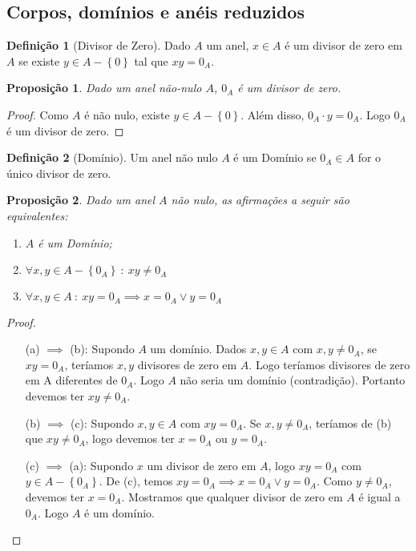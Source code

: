 \documentclass{article}
\theoremstyle{plain}
\newtheorem{prop}{Proposição}[section]
\theoremstyle{definition}
\newtheorem{definicao}{Definição}[section]
\theoremstyle{remark}
\begin{document}
\subsection{Corpos, domínios e anéis reduzidos}
\begin{definicao}[Divisor de Zero]
	Dado $A$ um anel, $x\in A$ é um divisor de zero em $A$ se existe $y\in A-\left\{0 \right\}$ tal que $xy = 0_A$.
\end{definicao}
\begin{prop}
	Dado um anel não-nulo $A$, $0_A$ é um divisor de zero.
\end{prop}
\begin{proof}
	Como $A$ é não nulo, existe $y\in A - \left\{0\right\}$. Além disso, $0_A \cdot y = 0_A$. Logo $0_A$ é um divisor de zero.
\end{proof}
\begin{definicao}[Domínio]
	Um anel não nulo $A$ é um Domínio se $0_A \in A$ for o único divisor de zero.
\end{definicao}
\begin{prop}
	Dado um anel $A$ não nulo, as afirmações a seguir são equivalentes:
	\begin{enumerate}[label=(\alph*)]
		\item $A$ é um Domínio;
		\item $\forall x,y \in A - \left\{ 0_A\right\} \: : \: xy \neq 0_A$
		\item $\forall x,y \in A  \: : \: xy = 0_A \implies x = 0_A \lor y = 0_A$
	\end{enumerate}
\end{prop}
\begin{proof}
	\begin{enumerate}[itemindent=36pt]
		\item[(a) $\implies$ (b):] Supondo $A$ um domínio. Dados $x,y\in A$ com $x,y\neq 0_A$,  se $xy = 0_A$, teríamos $x,y$ divisores de zero em $A$. Logo teríamos divisores de zero em A diferentes de $0_A$. Logo $A$ não seria um domínio (contradição). Portanto devemos ter $xy \neq 0_A$.
		\item[(b) $\implies$ (c):] Supondo $x,y\in A$ com $xy = 0_A$. Se $x,y\neq 0_A$, teríamos de (b) que $xy \neq 0_A$, logo devemos ter $x = 0_A$ ou $y = 0_A$.
		\item[(c) $\implies$ (a):] Supondo $x$ um divisor de zero em $A$, logo $xy = 0_A$ com $y\in A-\left\{ 0_A\right\}$. De (c), temos $xy =0_A \implies x = 0_A \lor y = 0_A$. Como $y\neq 0_A$, devemos ter $x = 0_A$. Mostramos que qualquer divisor de zero em $A$ é igual a $0_A$. Logo $A$ é um domínio.
	\end{enumerate}
\end{proof}
\end{document}
